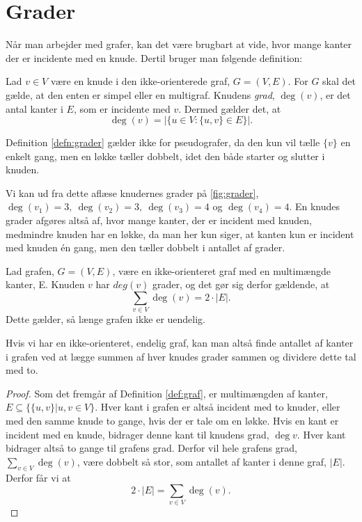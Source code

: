 \section{Grader} \label{sec:grader}
Når man arbejder med grafer, kan det være brugbart at vide, hvor mange kanter der er incidente med en knude. Dertil bruger man følgende definition:

\begin{defn}[Grader] \label{defn:grader}
Lad $v \in V$ være en knude i den ikke-orienterede graf, $G = (V,E)$. For $G$ skal det gælde, at den enten er simpel eller en multigraf. Knudens \emph{grad}, $\deg(v)$, er det antal kanter i $E$, som er incidente med $v$. Dermed gælder det, at
\begin{equation}
\deg(v)=|\{u \in V: \{u,v\} \in E \}|.
\end{equation}
\end{defn}

Definition \ref{defn:grader} gælder ikke for pseudografer, da den kun vil tælle $\{v\}$ en enkelt gang, men en løkke tæller dobbelt, idet den både starter og slutter i knuden.

\begin{exmp} \label{ex:grader}

Vi kan ud fra dette aflæse knudernes grader på \autoref{fig:grader}, $\deg(v_{1})=3, \ \deg(v_{2})=3, \ \deg(v_{3})=4$ og $\deg(v_{4})=4$. En knudes grader afgøres altså af, hvor mange kanter, der er incident med knuden, medmindre knuden har en løkke, da man her kun siger, at kanten kun er incident med knuden én gang, men den tæller dobbelt i antallet af grader.


\end{exmp}

\begin{thm}
Lad grafen, $G = (V,E)$, være en ikke-orienteret graf med en multimængde kanter, E. Knuden $v$ har $deg(v)$ grader, og det gør sig derfor gældende, at
\begin{equation} \label{eq:degv=2e}
	\sum_{v \in V} { } \deg(v) = 2 \cdot |E|.
\end{equation}
Dette gælder, så længe grafen ikke er uendelig.
\end{thm}
Hvis vi har en ikke-orienteret, endelig graf, kan man altså finde antallet af kanter i grafen ved at lægge summen af hver knudes grader sammen og dividere dette tal med to.

\begin{proof}
Som det fremgår af Definition \ref{def:graf}, er multimængden af kanter, $E \subseteq \{\{u,v\}|u,v \in V \}$. Hver kant i grafen er altså incident med to knuder, eller med den samme knude to gange, hvis der er tale om en løkke. Hvis en kant er incident med en knude, bidrager denne kant til knudens grad, $\deg{v}$. Hver kant bidrager altså to gange til grafens grad. Derfor vil hele grafens grad, $\sum_{v \in V} { } \deg(v)$, være dobbelt så stor, som antallet af kanter i denne graf, $|E|$. Derfor får vi at 
\begin{equation}
2 \cdot |E|= \sum_{v \in V} { } \deg(v).
\end{equation} 
\end{proof}


